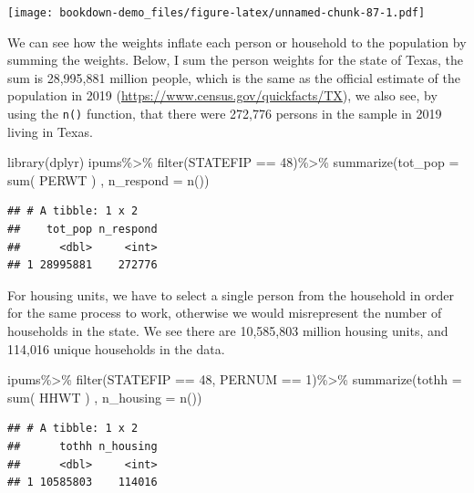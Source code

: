 \documentclass[
]{article}
\newenvironment{Shaded}{\begin{snugshade}}{\end{snugshade}}
\newcommand{\AttributeTok}[1]{\textcolor[rgb]{0.77,0.63,0.00}{#1}}
\newcommand{\DecValTok}[1]{\textcolor[rgb]{0.00,0.00,0.81}{#1}}
\newcommand{\FunctionTok}[1]{\textcolor[rgb]{0.00,0.00,0.00}{#1}}
\newcommand{\NormalTok}[1]{#1}
\newcommand{\SpecialCharTok}[1]{\textcolor[rgb]{0.00,0.00,0.00}{#1}}
\begin{document}
\texttt{[image: bookdown-demo\_files/figure-latex/unnamed-chunk-87-1.pdf]}

We can see how the weights inflate each person or household to the population by summing the weights. Below, I sum the person weights for the state of Texas, the sum is 28,995,881 million people, which is the same as the official estimate of the population in 2019 (\url{https://www.census.gov/quickfacts/TX}), we also see, by using the \texttt{n()} function, that there were 272,776 persons in the sample in 2019 living in Texas.

\begin{Shaded}
\begin{Highlighting}[]
\FunctionTok{library}\NormalTok{(dplyr)}
\NormalTok{ipums}\SpecialCharTok{\%\textgreater{}\%}
  \FunctionTok{filter}\NormalTok{(STATEFIP }\SpecialCharTok{==} \DecValTok{48}\NormalTok{)}\SpecialCharTok{\%\textgreater{}\%}
  \FunctionTok{summarize}\NormalTok{(}\AttributeTok{tot\_pop =} \FunctionTok{sum}\NormalTok{( PERWT ) , }\AttributeTok{n\_respond =} \FunctionTok{n}\NormalTok{())}
\end{Highlighting}
\end{Shaded}

\begin{verbatim}
## # A tibble: 1 x 2
##    tot_pop n_respond
##      <dbl>     <int>
## 1 28995881    272776
\end{verbatim}

For housing units, we have to select a single person from the household in order for the same process to work, otherwise we would misrepresent the number of households in the state. We see there are 10,585,803 million housing units, and 114,016 unique households in the data.

\begin{Shaded}
\begin{Highlighting}[]
\NormalTok{ipums}\SpecialCharTok{\%\textgreater{}\%}
  \FunctionTok{filter}\NormalTok{(STATEFIP }\SpecialCharTok{==} \DecValTok{48}\NormalTok{,}
\NormalTok{         PERNUM }\SpecialCharTok{==} \DecValTok{1}\NormalTok{)}\SpecialCharTok{\%\textgreater{}\%}
  \FunctionTok{summarize}\NormalTok{(}\AttributeTok{tothh =} \FunctionTok{sum}\NormalTok{( HHWT ) , }\AttributeTok{n\_housing =} \FunctionTok{n}\NormalTok{())}
\end{Highlighting}
\end{Shaded}

\begin{verbatim}
## # A tibble: 1 x 2
##      tothh n_housing
##      <dbl>     <int>
## 1 10585803    114016
\end{verbatim}
\end{document}
